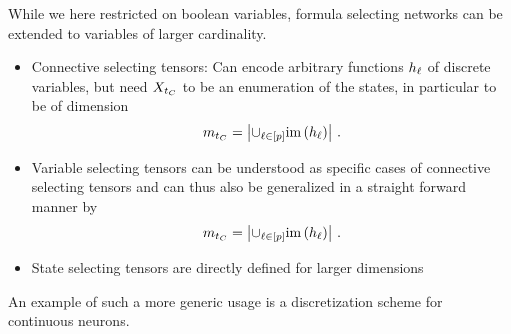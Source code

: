 While we here restricted on boolean variables, formula selecting networks can be extended to variables of larger cardinality.
\begin{itemize}
    \item Connective selecting tensors: Can encode arbitrary functions $h_{\ell}$ of discrete variables, but need $X_{t_{C}}$ to be an enumeration of the states, in particular to be of dimension
    \[ m_{t_{C}} = \left| \cup_{\ell\in[p]} \mathrm{im}\left(h_{\ell}\right) \right| \, . \]
    \item Variable selecting tensors can be understood as specific cases of connective selecting tensors and can thus also be generalized in a straight forward manner by
    \[ m_{t_{C}} = \left| \cup_{\ell\in[p]} \mathrm{im}\left(h_{\ell}\right) \right| \, .  \]
    \item State selecting tensors are directly defined for larger dimensions
\end{itemize}


An example of such a more generic usage is a discretization scheme for continuous neurons.

